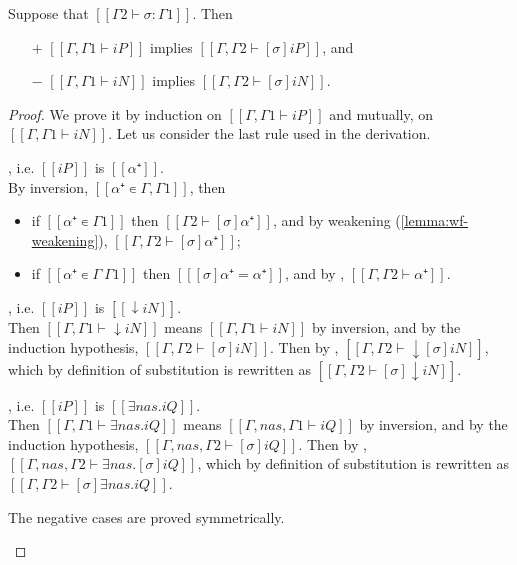 \begin{lemma}
  \label{lemma:wf-subst}
  Suppose that $[[Γ2 ⊢ σ : Γ1]]$. Then
  \begin{itemize}
  \item[$+$] $[[Γ, Γ1 ⊢ iP]]$ implies $[[Γ, Γ2 ⊢ [σ]iP]]$, and
  \item[$-$] $[[Γ, Γ1 ⊢ iN]]$ implies $[[Γ, Γ2 ⊢ [σ]iN]]$.
  \end{itemize}
\end{lemma}
\begin{proof}
  We prove it by induction on $[[Γ, Γ1 ⊢ iP]]$ and mutually, on $[[Γ, Γ1 ⊢ iN]]$.
  Let us consider the last rule used in the derivation.
  \begin{caseof}
    \item {}, 
      i.e. $[[iP]]$ is $[[α⁺]]$.\\
      By inversion, $[[α⁺ ∊ {Γ, Γ1}]]$, then
      \begin{itemize}
        \item if $[[α⁺ ∊ {Γ1}]]$ then $[[ Γ2 ⊢ [σ]α⁺ ]]$, 
          and by weakening (\cref{lemma:wf-weakening}),
          $[[ Γ, Γ2 ⊢ [σ]α⁺ ]]$;
        \item if $[[α⁺ ∊ {Γ} \ {Γ1}]]$ then $[[ [σ]α⁺ = α⁺ ]]$,
          and by , $[[ Γ, Γ2 ⊢ α⁺ ]]$.
      \end{itemize}

    \item {},
      i.e. $[[iP]]$ is $[[↓iN]]$.\\
      Then $[[Γ, Γ1 ⊢ ↓iN]]$ means $[[Γ, Γ1 ⊢ iN]]$ by inversion,
      and by the induction hypothesis, $[[Γ, Γ2 ⊢ [σ]iN]]$.
      Then by  , $[[Γ, Γ2 ⊢ ↓[σ]iN]]$, 
      which by definition of substitution is rewritten as $[[Γ, Γ2 ⊢ [σ]↓iN]]$.

    \item {},
      i.e. $[[iP]]$ is $[[∃nas.iQ]]$.\\
      Then $[[Γ, Γ1 ⊢ ∃nas.iQ]]$ means $[[Γ, nas, Γ1 ⊢ iQ]]$ 
      by inversion, and by the induction hypothesis, 
      $[[Γ, nas, Γ2 ⊢ [σ]iQ]]$.
      Then by  , 
      $[[Γ, nas, Γ2 ⊢ ∃nas.[σ]iQ]]$, 
      which by definition of substitution is rewritten as 
      $[[Γ, Γ2 ⊢ [σ]∃nas.iQ]]$.

    \item The negative cases are proved symmetrically.
  \end{caseof}

\end{proof}